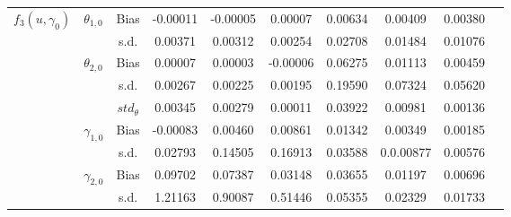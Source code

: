 \documentclass[a4paper,12pt,times,numbered,print,index]{report}
\numberwithin{equation}{section}
\begin{document}
\begin{table}[htbp]
\begin{adjustbox}{max width=0.95\textwidth}
\begin{tabular}{clcccccccc}
				
				\hline
				
				\multirow{8}[0]{*}{$f_3(u,\gamma_{0})$} & \multirow{2}[0]{*}{$\theta_{1,0}$} & Bias & -0.00011 & -0.00005 & 0.00007 & 0.00634 & 0.00409 & 0.00380 \\
				&   & s.d. & 0.00371 & 0.00312 & 0.00254 & 0.02708 & 0.01484 & 0.01076 \\
				& \multirow{2}[0]{*}{$\theta_{2,0}$} & Bias & 0.00007 & 0.00003 & -0.00006 & 0.06275 & 0.01113 & 0.00459 \\
				&   & s.d. & 0.00267 & 0.00225 & 0.00195 & 0.19590 & 0.07324 & 0.05620 \\
				&	& $std_{\theta}$  & 0.00345 & 0.00279 & 0.00011 & 0.03922 & 0.00981 & 0.00136\\
				& \multirow{2}[0]{*}{$\gamma_{1,0}$} & Bias & -0.00083 & 0.00460 & 0.00861 & 0.01342 & 0.00349 & 0.00185 \\
				&   & s.d. & 0.02793 & 0.14505 & 0.16913 & 0.03588 & 0.0.00877 & 0.00576 \\
				& \multirow{2}[0]{*}{$\gamma_{2,0}$} & Bias & 0.09702 & 0.07387 & 0.03148 & 0.03655 & 0.01197 & 0.00696 \\
				&   & s.d. & 1.21163 & 0.90087 & 0.51446 & 0.05355 & 0.02329 & 0.01733 \\
				
				
				\hline \hline
			\end{tabular}%
		\end{adjustbox}
	\end{table}%
	
\end{document}
